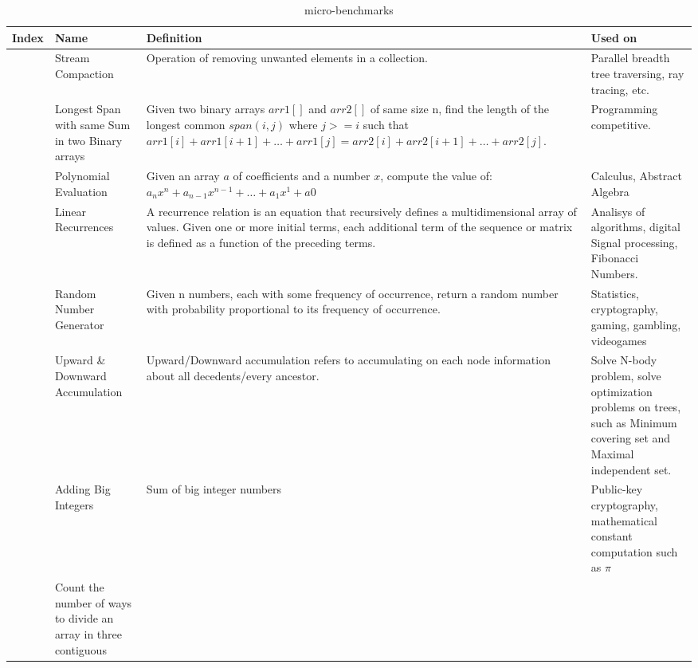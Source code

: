 \documentclass[Ingles]{ic-tese-v1}
\begin{document}
\begin{table}[!t]
	\centering
	\caption[small]{micro-benchmarks}
	\begin{adjustbox}{max width=1.1\textwidth, center}
		\begin{tabular}{|>{\centering\arraybackslash}p{0.8cm}|p{5cm}|p{9cm}|p{5cm}|} \hline
			Index  & Name & Definition & Used  on \\ \hline
			1 & Stream  Compaction
			& Operation of removing unwanted elements in  a collection.
			& Parallel breadth tree  traversing, ray tracing, etc.\\ \hline
			2  & Longest Span with same Sum in two Binary arrays
			& Given two binary arrays $arr1[]$ and $arr2[]$ of same size n, find the
			length of the longest common $span (i, j)$ where $j >= i$ such that
			$arr1[i] + arr1[i+1] + \dotso + arr1[j] = arr2[i] + arr2[i+1] + \dotso +
			arr2[j]$.
			& Programming competitive.\\ \hline
			3 & Polynomial Evaluation
			& Given an array $a$ of coefficients and a number  $x$,   compute  the   value  of:
			$a_nx^n  + a_{n-1}x^{n-1}  + \dotso  +  a_1x^1 + a0$
			& Calculus,  Abstract  Algebra\\ \hline
			4 & Linear Recurrences
			& A recurrence relation is an equation that
			recursively  defines  a  multidimensional
			array  of  values.   Given  one  or  more
			initial  terms, each  additional term  of
			the sequence  or matrix  is defined  as a
			function   of   the   preceding   terms.
			& Analisys  of  algorithms,  digital Signal  processing,  Fibonacci Numbers.\\ \hline
			5  & Random  Number Generator
			& Given  n numbers,  each with  some
			frequency  of  occurrence, return  a
			random  number  with  probability
			proportional to its
			frequency of occurrence.
			& Statistics, cryptography, gaming, gambling, videogames\\ \hline
			6   & Upward \&  Downward Accumulation
			& Upward/Downward accumulation refers  to   accumulating  on
			each node  information about all decedents/every ancestor.
			& Solve  N-body  problem,  solve    optimization  problems
			on  trees, such as Minimum   covering   set  and  Maximal
			independent set.\\ \hline
			7   & Adding Big Integers
			&  Sum of big integer numbers
			& Public-key  cryptography,  mathematical  constant computation  such as $\pi$ \\ \hline
			8   & Count the number of ways to divide an array in three contiguous

\end{tabular}
\end{adjustbox}
\end{table}
\end{document}
